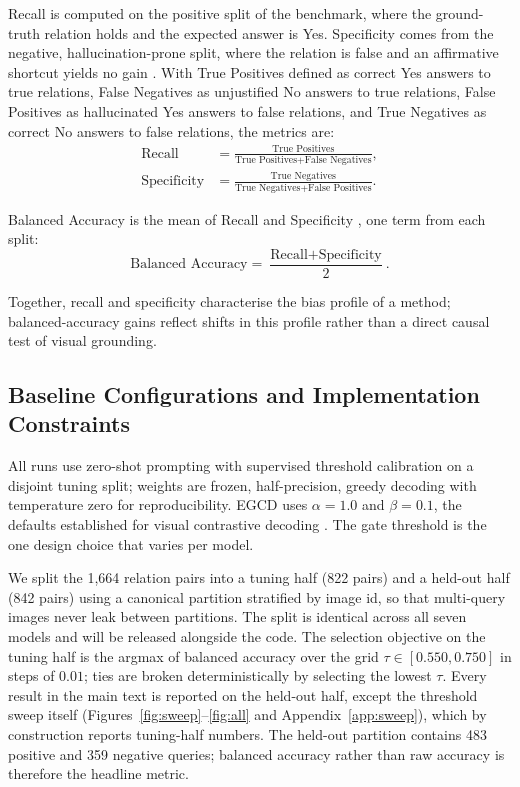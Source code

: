 \documentclass{ieeeaccess}
\begin{document}
Recall is computed on the positive split of the benchmark, where the ground-truth relation holds and the expected answer is Yes. Specificity comes from the negative, hallucination-prone split, where the relation is false and an affirmative shortcut yields no gain \cite{yin2025mirage}. With True Positives defined as correct Yes answers to true relations, False Negatives as unjustified No answers to true relations, False Positives as hallucinated Yes answers to false relations, and True Negatives as correct No answers to false relations, the metrics are:
\begin{align}
\text{Recall} &= \frac{\text{True Positives}}{\text{True Positives} + \text{False Negatives}}, \label{eq:recall}\\
\text{Specificity} &= \frac{\text{True Negatives}}{\text{True Negatives} + \text{False Positives}}. \label{eq:spec}
\end{align}

Balanced Accuracy is the mean of Recall and Specificity \cite{brodersen2010balanced}, one term from each split:
\begin{equation}\label{eq:balacc}
\text{Balanced Accuracy} = \frac{\text{Recall} + \text{Specificity}}{2}.
\end{equation}

Together, recall and specificity characterise the bias profile of a method; balanced-accuracy gains reflect shifts in this profile rather than a direct causal test of visual grounding.

\subsection{Baseline Configurations and Implementation Constraints}\label{subsec:baselines}

All runs use zero-shot prompting with supervised threshold calibration on a disjoint tuning split; weights are frozen, half-precision, greedy decoding with temperature zero for reproducibility. EGCD uses $\alpha = 1.0$ and $\beta = 0.1$, the defaults established for visual contrastive decoding \cite{leng2024mitigating}. The gate threshold is the one design choice that varies per model.

We split the 1,664 relation pairs into a tuning half (822 pairs) and a held-out half (842 pairs) using a canonical partition stratified by image id, so that multi-query images never leak between partitions. The split is identical across all seven models and will be released alongside the code. The selection objective on the tuning half is the argmax of balanced accuracy over the grid $\tau \in [0.550, 0.750]$ in steps of $0.01$; ties are broken deterministically by selecting the lowest $\tau$. Every result in the main text is reported on the held-out half, except the threshold sweep itself (Figures~\ref{fig:sweep}--\ref{fig:all} and Appendix~\ref{app:sweep}), which by construction reports tuning-half numbers. The held-out partition contains 483 positive and 359 negative queries; balanced accuracy rather than raw accuracy is therefore the headline metric.
\end{document}
